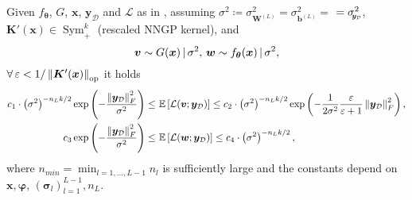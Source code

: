 \begin{lemma} \label{lem:boundexplikelihood}
	Given $f_{\bm{\theta}}$, $G$, $\bm{x}$, $\bm{y}_{\mathcal{D}}$ and $\mathcal{L}$ as in , assuming $\sigma^2 \coloneqq \sigma_{\bm{W}^{(L)}}^2 = \sigma_{\bm{b}^{(L)}}^2 =$ $= \sigmay^2$, $\bm{K}'(\bm{x}) \in \operatorname{Sym}_+^{k}$ (rescaled NNGP kernel), and 
	\begin{equation*}
		\bm{v} \sim G(\bm{x}) \, | \, \sigma^2, \, \bm{w} \sim f_{\bm{\theta}}(\bm{x}) \, | \, \sigma^2,
	\end{equation*}
	$\forall \epsilon < 1/\norm{\bm{K}'(\bm{x})}_{\mathrm{op}}$ it holds
	\begin{equation*}
		\begin{aligned}
			c_1 \cdot \left(\sigma^2\right)^{- n_L k / 2} \operatorname{exp}\left(-\frac{\left\lVert\bm{y}_{\mathcal{D}}\right\rVert_F^2}{\sigma^2}\right) \leq \ & \mathbb{E}_{\kern-0.5pt}\left[\mathcal{L}(\bm{v}; \bm{y}_{\mathcal{D}})\right] \leq c_2 \cdot \left(\sigma^2\right)^{- n_L k / 2} \operatorname{exp}\left(-\frac{1}{2 \sigma^2} \frac{\varepsilon}{\varepsilon + 1} \left\lVert\bm{y}_{\mathcal{D}}\right\rVert_F^2\right), \\
			c_3 \operatorname{exp}\left(-\frac{\left\lVert\bm{y}_{\mathcal{D}}\right\rVert_F^2}{\sigma^2}\right) \leq \ & \mathbb{E}_{\kern-0.5pt}\left[\mathcal{L}(\bm{w}; \bm{y}_{\mathcal{D}})\right] \leq c_4 \cdot \left(\sigma^2\right)^{- n_L k / 2},
		\end{aligned}
	\end{equation*}
	where $n_{min} = \min_{l = 1, \dots, L - 1} n_l$ is sufficiently large and the constants depend on $\bm{x}, \bm{\varphi}$, $\left(\bm{\sigma}_l\right)_{l = 1}^{L - 1}, n_L$.
\end{lemma}
